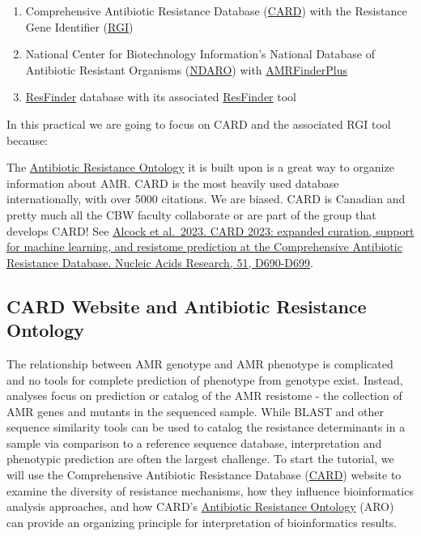 \documentclass[
]{book}
\providecommand{\tightlist}{%
  \setlength{\itemsep}{0pt}\setlength{\parskip}{0pt}}
\begin{document}
\begin{enumerate}
\def\labelenumi{\arabic{enumi}.}
\tightlist
\item
  Comprehensive Antibiotic Resistance Database (\href{http://card.mcmaster.ca/}{CARD}) with the Resistance Gene Identifier (\href{https://github.com/arpcard/rgi}{RGI})
\item
  National Center for Biotechnology Information's National Database of Antibiotic Resistant Organisms (\href{https://www.ncbi.nlm.nih.gov/pathogens/antimicrobial-resistance/}{NDARO}) with \href{https://www.ncbi.nlm.nih.gov/pathogens/antimicrobial-resistance/AMRFinder/}{AMRFinderPlus}
\item
  \href{https://cge.cbs.dtu.dk/services/ResFinder/}{ResFinder} database with its associated \href{https://cge.cbs.dtu.dk/services/ResFinder/}{ResFinder} tool
\end{enumerate}

In this practical we are going to focus on CARD and the associated RGI tool because:

The \href{https://card.mcmaster.ca/ontology/36006}{Antibiotic Resistance Ontology} it is built upon is a great way to organize information about AMR.
CARD is the most heavily used database internationally, with over 5000 citations.
We are biased. CARD is Canadian and pretty much all the CBW faculty collaborate or are part of the group that develops CARD! See \href{https://pubmed.ncbi.nlm.nih.gov/36263822/}{Alcock et al.~2023. CARD 2023: expanded curation, support for machine learning, and resistome prediction at the Comprehensive Antibiotic Resistance Database. Nucleic Acids Research, 51, D690-D699}.

\subsection{CARD Website and Antibiotic Resistance Ontology}\label{card-website-and-antibiotic-resistance-ontology}

The relationship between AMR genotype and AMR phenotype is complicated and no tools for complete prediction of phenotype from genotype exist. Instead, analyses focus on prediction or catalog of the AMR resistome - the collection of AMR genes and mutants in the sequenced sample. While BLAST and other sequence similarity tools can be used to catalog the resistance determinants in a sample via comparison to a reference sequence database, interpretation and phenotypic prediction are often the largest challenge. To start the tutorial, we will use the Comprehensive Antibiotic Resistance Database (\href{http://card.mcmaster.ca/}{CARD}) website to examine the diversity of resistance mechanisms, how they influence bioinformatics analysis approaches, and how CARD's \href{https://card.mcmaster.ca/ontology/36006}{Antibiotic Resistance Ontology} (ARO) can provide an organizing principle for interpretation of bioinformatics results.
\end{document}
